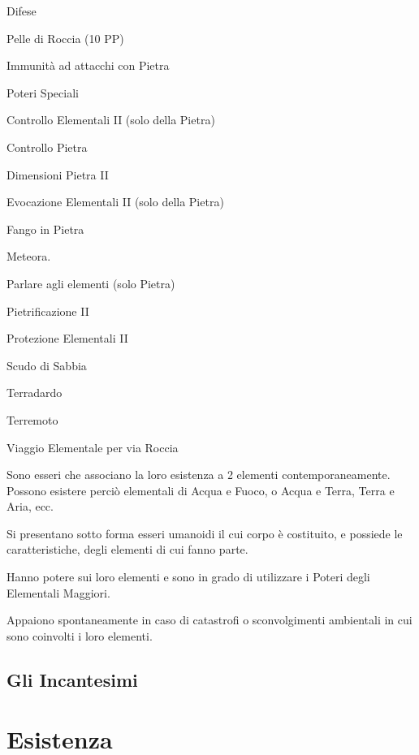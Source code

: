 \begin{parmostro}{Difese} 
\item Pelle di Roccia (10 PP) 
\item Immunit\`a ad attacchi con Pietra
\end{parmostro}

\begin{parmostro}{Poteri Speciali}
\item Controllo Elementali II (solo della Pietra)
\item Controllo Pietra
\item Dimensioni Pietra II
\item Evocazione Elementali II (solo della Pietra)
\item Fango in Pietra 
\item Meteora.
\item Parlare agli elementi (solo Pietra)
\item Pietrificazione II
\item Protezione Elementali II
\item Scudo di Sabbia
\item Terradardo
\item Terremoto
\item Viaggio Elementale per via Roccia
\end{parmostro}


Sono esseri che associano la loro esistenza a 2 elementi contemporaneamente.
Possono esistere perci\`o elementali di Acqua e Fuoco, o Acqua e Terra, Terra
e Aria, ecc. 

Si presentano sotto forma esseri umanoidi il cui corpo \`e costituito,
e possiede le caratteristiche, degli elementi di cui fanno parte.

Hanno potere sui loro elementi e sono in grado di utilizzare i Poteri
degli Elementali Maggiori. 

Appaiono spontaneamente in caso di catastrofi o sconvolgimenti
ambientali in cui sono coinvolti i loro elementi.
\fi

\subsection{Gli Incantesimi}
\label{incelementalismo}


\iffullversion
\vspace{10cm}\vfill{}
\vfill\section{Esistenza} 

